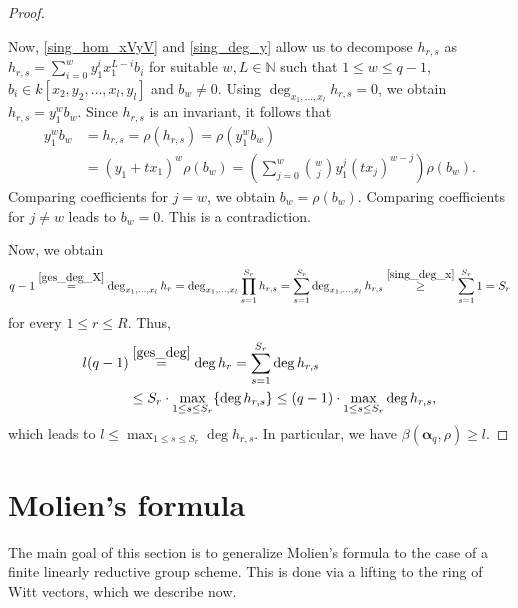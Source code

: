 \documentclass[reqno]{amsart}
\newcommand{\NN}{{\mathbb{N}}}
\newcommand{\balpha}{\boldsymbol{\alpha}}
\theoremstyle{definition}
\theoremstyle{plain}
\begin{document}
\begin{proof}
\begin{enumerate}
	Now, \eqref{sing_hom_xVyV} and \eqref{sing_deg_y} allow us to decompose $h_{r,s}$ as $h_{r,s} = \sum_{i=0}^w y_1^ix_1^{L-i} b_i$ for suitable $w,L \in \NN$ such that $1 \leq w \leq q-1$, $b_i \in k[x_2, y_2, \dots, x_l, y_l]$ and $b_w \neq 0$. Using $\deg_{x_1, \dots, x_{l}} h_{r,s} =0$, we obtain $h_{r,s} = y_1^w b_w$. Since $h_{r,s}$ is an invariant, it follows that
	\begin{align*}
		y_1^w b_w
		&= h_{r,s}
		= \rho \left( h_{r,s} \right)
		= \rho \left( y_1^w b_w\right)\\
		&= (y_1+tx_1)^w \rho(b_w)
		= \left(
		\sum_{j=0}^w \binom{w}{j} y_1^j (tx_j)^{w-j}
		\right) \rho(b_w).
	\end{align*}
	Comparing coefficients for $j=w$, we obtain $b_w = \rho(b_w)$. Comparing coefficients for $j \neq w$ leads to $b_w=0$. This is a contradiction.	
\end{enumerate}
Now, we obtain 
\[
q-1 
\overset{\eqref{ges_deg_X}}{=} \deg_{x_1, \dots, x_{l}} h_r
= \deg_{x_1, \dots, x_{l}} \prod_{s=1}^{S_r} h_{r,s}
= \sum_{s=1}^{S_r} \deg_{x_1, \dots, x_{l}} h_{r,s}
\overset{\eqref{sing_deg_x}}{\geq} \sum_{s=1}^{S_r} 1
= S_r
\]
for every $1 \leq r \leq R$. Thus, 
\begin{align*}
	l(q-1) 
	&\overset{\eqref{ges_deg}}{=}\deg h_r
	= \sum_{s=1}^{S_r} \deg h_{r,s}\\
	&\leq S_r \cdot \max_{1 \leq s \leq S_r}\{ \deg h_{r,s} \}
	\leq (q-1) \cdot \max_{1 \leq s \leq S_r} \deg h_{r,s} ,
\end{align*}
which leads to $l \leq \max_{1 \leq s \leq S_r} \deg h_{r,s}$.
In particular, we have $\beta(\balpha_q,\rho) \ge l$.
\end{proof}

\section{Molien's formula} \label{sMolien}

The main goal of this section is to generalize Molien's formula
to the case of a finite linearly reductive group scheme. This is done
via a lifting to the ring of Witt vectors, which we describe now.
\end{document}
